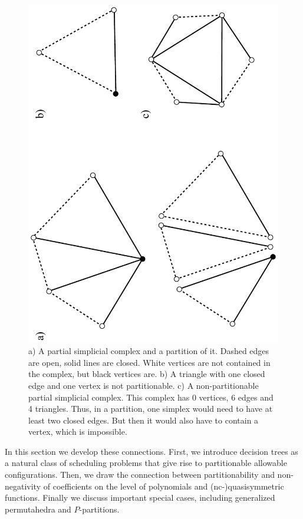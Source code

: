 \documentclass[12pt,reqno]{amsart}
\numberwithin{definition}{section}
\theoremstyle{definition}
\begin{document}
\begin{figure}[h]
\includegraphics[angle=270,width=4.5in]{partitions}
\caption{a) A partial simplicial complex and a partition of it. Dashed edges are open, solid lines are closed. White vertices are not contained in the complex, but black vertices are. b) A triangle with one closed edge and one vertex is not partitionable. c) A non-partitionable partial simplicial complex. This complex has 0 vertices, 6 edges and 4 triangles. Thus, in a partition, one simplex would need to have at least two closed edges. But then it would also have to contain a vertex, which is impossible.}
\label{fig:partitionability}
\end{figure}

In this section we develop these connections. First, we introduce decision trees as a natural class of scheduling problems that give rise to partitionable allowable configurations. Then, we draw the connection between partitionability and non-negativity of coefficients on the level of polynomials and (nc-)quasisymmetric functions. Finally we discuss important special cases, including generalized permutahedra and $P$-partitions.
\end{document}
